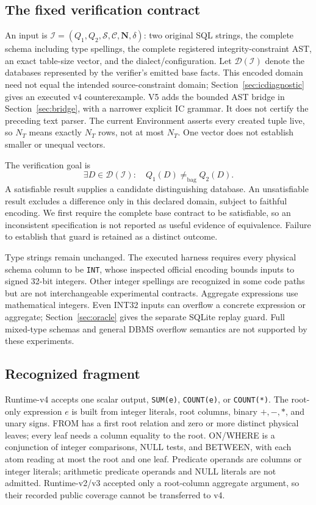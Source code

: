 \documentclass[3p,times,authoryear]{elsarticle}
\begin{document}
\subsection{The fixed verification contract}
An input is $\mathcal I=(Q_1,Q_2,\mathcal S,\mathcal C,\mathbf N,\delta)$: two original SQL strings, the complete schema including type spellings, the complete registered integrity-constraint AST, an exact table-size vector, and the dialect/configuration. Let $\mathcal D(\mathcal I)$ denote the databases represented by the verifier's emitted base facts. This encoded domain need not equal the intended source-constraint domain; Section~\ref{sec:icdiagnostic} gives an executed v4 counterexample. V5 adds the bounded AST bridge in Section~\ref{sec:bridge}, with a narrower explicit IC grammar. It does not certify the preceding text parser. The current Environment asserts every created tuple live, so $N_T$ means exactly $N_T$ rows, not at most $N_T$. One vector does not establish smaller or unequal vectors.

The verification goal is
\begin{equation}
 \exists D\in\mathcal D(\mathcal I):\quad Q_1(D)\ne_{\mathrm{bag}}Q_2(D).
 \label{eq:goal}
\end{equation}
A satisfiable result supplies a candidate distinguishing database. An unsatisfiable result excludes a difference only in this declared domain, subject to faithful encoding. We first require the complete base contract to be satisfiable, so an inconsistent specification is not reported as useful evidence of equivalence. Failure to establish that guard is retained as a distinct outcome.

Type strings remain unchanged. The executed harness requires every physical schema column to be \texttt{INT}, whose inspected official encoding bounds inputs to signed 32-bit integers. Other integer spellings are recognized in some code paths but are not interchangeable experimental contracts. Aggregate expressions use mathematical integers. Even INT32 inputs can overflow a concrete expression or aggregate; Section~\ref{sec:oracle} gives the separate SQLite replay guard. Full mixed-type schemas and general DBMS overflow semantics are not supported by these experiments.

\subsection{Recognized fragment}
Runtime-v4 accepts one scalar output, \texttt{SUM(e)}, \texttt{COUNT(e)}, or \texttt{COUNT(*)}. The root-only expression $e$ is built from integer literals, root columns, binary $+,-,*$, and unary signs. FROM has a first root relation and zero or more distinct physical leaves; every leaf needs a column equality to the root. ON/WHERE is a conjunction of integer comparisons, NULL tests, and BETWEEN, with each atom reading at most the root and one leaf. Predicate operands are columns or integer literals; arithmetic predicate operands and NULL literals are not admitted. Runtime-v2/v3 accepted only a root-column aggregate argument, so their recorded public coverage cannot be transferred to v4.
\end{document}
